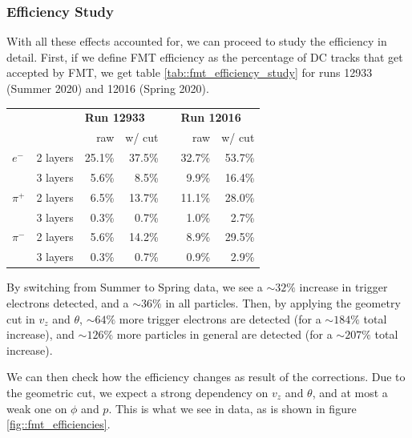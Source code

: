 \subsubsection{Efficiency Study}
\label{sssec::efficiency_study}
    With all these effects accounted for, we can proceed to study the efficiency in detail.
    First, if we define FMT efficiency as the percentage of DC tracks that get accepted by FMT, we get table \ref{tab::fmt_efficiency_study} for runs 12933 (Summer 2020) and 12016 (Spring 2020).

    \begin{center}
        \begin{tabularx}{0.70\textwidth}{Xr|rrcrr}
            & & \multicolumn{2}{l}{\textbf{Run 12933}}  & & \multicolumn{2}{l}{\textbf{Run 12016}} \\
                             &          & raw  & w/ cut   & & raw  & w/ cut   \\
            \hline
            \textbf{$e^-$}   & 2 layers & 25.1\% & 37.5\% & & 32.7\% & 53.7\% \\
                             & 3 layers &  5.6\% &  8.5\% & &  9.9\% & 16.4\% \\
            \hline
            \textbf{$\pi^+$} & 2 layers &  6.5\% & 13.7\% & & 11.1\% & 28.0\% \\
                             & 3 layers &  0.3\% &  0.7\% & &  1.0\% &  2.7\% \\
            \hline
            \textbf{$\pi^-$} & 2 layers &  5.6\% & 14.2\% & &  8.9\% & 29.5\% \\
                             & 3 layers &  0.3\% &  0.7\% & &  0.9\% &  2.9\%
        \end{tabularx}
        \label{tab::fmt_efficiency_study}
    \end{center}

    By switching from Summer to Spring data, we see a $\sim32\%$ increase in trigger electrons detected, and a $\sim36\%$ in all particles.
    Then, by applying the geometry cut in $v_z$ and $\theta$, $\sim64\%$ more trigger electrons are detected (for a $\sim184\%$ total increase), and $\sim126\%$ more particles in general are detected (for a $\sim207\%$ total increase).

    We can then check how the efficiency changes as result of the corrections.
    Due to the geometric cut, we expect a strong dependency on $v_z$ and $\theta$, and at most a weak one on $\phi$ and $p$.
    This is what we see in data, as is shown in figure \ref{fig::fmt_efficiencies}.

